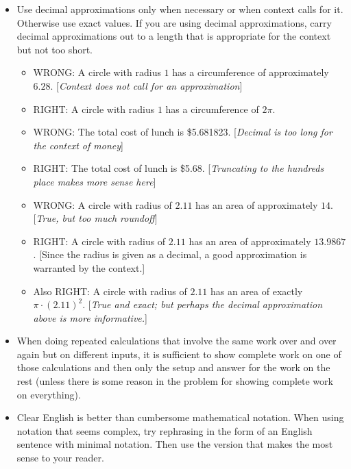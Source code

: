 \documentclass[11pt]{article}
\begin{document}
\begin{itemize}
	\item Use decimal approximations only when necessary or when context calls for it. Otherwise use exact values. If you are using decimal approximations, carry decimal approximations out to a length that is appropriate for the context but not too short. 
		\begin{itemize}
			\item WRONG: A circle with radius $1$ has a circumference of approximately $6.28$. [\emph{Context does not call for an approximation}]
			\item RIGHT: A circle with radius $1$ has a circumference of $2 \pi$. 
			\item WRONG: The total cost of lunch is \$5.681823. [\emph{Decimal is too long for the context of money}]
			\item RIGHT: The total cost of lunch is \$5.68. [\emph{Truncating to the hundreds place makes more sense here}]
			\item WRONG: A circle with radius of $2.11$ has an area of approximately $14$. [\emph{True, but too much roundoff}]
			\item RIGHT: A circle with radius of $2.11$ has an area of approximately $13.9867$. [Since the radius is given as a decimal, a good approximation is warranted by the context.]
			\item Also RIGHT:  A circle with radius of $2.11$ has an area of exactly $\pi \cdot (2.11)^2$. [\emph{True and exact; but perhaps the decimal approximation above is more informative.}]
		\end{itemize}
	
	\item When doing repeated calculations that involve the same work over and over again but on different inputs, it is sufficient to show complete work on one of those calculations and then only the setup and answer for the work on the rest (unless there is some reason in the problem for showing complete work on everything). 
			
	\item Clear English is better than cumbersome mathematical notation. When using notation that seems complex, try rephrasing in the form of an English sentence with minimal notation. Then use the version that makes the most sense to your reader. 
	
		
	\end{itemize}
	
	
	
\end{document}
